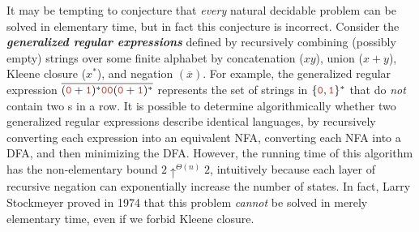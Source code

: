 It may be tempting to conjecture that \textit{every} natural decidable problem can be solved in elementary time, but in fact this conjecture is incorrect.
Consider the \textbf{\textit{generalized regular expressions}} defined by recursively combining (possibly empty) strings over some finite alphabet by concatenation ($xy$), union ($x + y$), Kleene closure ($x^*$), and negation $(\overline{x})$.
For example, the generalized regular expression $\overline{(\mbox{\Str{0}} + \mbox{\Str{1}})^*\mbox{\Str{00}}(\mbox{\Str{0}} + \mbox{\Str{1}})^*}$ represents the set of strings in $\{\mbox{\Str{0}}, \mbox{\Str{1}}\}^*$ that do \textit{not} contain two s in a row.
It is possible to determine algorithmically whether two generalized regular expressions describe identical languages, by recursively converting each expression into an equivalent NFA, converting each NFA into a DFA, and then minimizing the DFA.
However, the running time of this algorithm has the non-elementary bound $2 \uparrow^{\Theta(n)} 2$, intuitively because each layer of recursive negation can exponentially increase the number of states.
In fact, Larry Stockmeyer proved in 1974 that this problem \textit{cannot} be solved in merely elementary time, even if we forbid Kleene closure.

